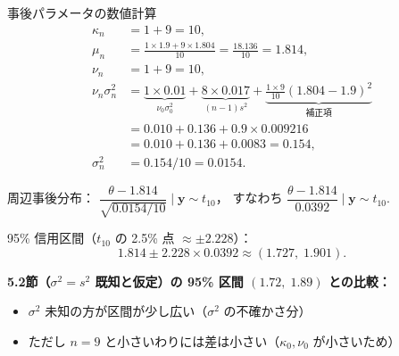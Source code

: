\documentclass[lualatex,ja=standard,a4paper,12pt]{bxjsarticle}
\begin{document}
\begin{derivbox}{事後パラメータの数値計算}
\begin{align*}
  \kappa_n &= 1 + 9 = 10, \\[4pt]
  \mu_n &= \frac{1 \times 1.9 + 9 \times 1.804}{10} = \frac{18.136}{10} = 1.814, \\[4pt]
  \nu_n &= 1 + 9 = 10, \\[4pt]
  \nu_n\sigma_n^2
  &= \underbrace{1 \times 0.01}_{\nu_0\sigma_0^2}
   + \underbrace{8 \times 0.017}_{(n-1)s^2}
   + \underbrace{\frac{1 \times 9}{10}(1.804 - 1.9)^2}_{\text{補正項}} \\
  &= 0.010 + 0.136 + 0.9 \times 0.009216 \\
  &= 0.010 + 0.136 + 0.0083 = 0.154, \\[4pt]
  \sigma_n^2 &= 0.154/10 = 0.0154.
\end{align*}

周辺事後分布：
$\dfrac{\theta - 1.814}{\sqrt{0.0154/10}} \mid \mathbf{y} \sim t_{10}$，
すなわち $\dfrac{\theta - 1.814}{0.0392} \mid \mathbf{y} \sim t_{10}$.

95\% 信用区間（$t_{10}$ の 2.5\% 点 $\approx \pm 2.228$）：
\[
  1.814 \pm 2.228 \times 0.0392 \approx (1.727,\; 1.901).
\]

\noindent\textbf{5.2節（$\sigma^2 = s^2$ 既知と仮定）の 95\% 区間 $(1.72,\; 1.89)$ との比較：}
\begin{itemize}
  \item $\sigma^2$ 未知の方が区間が少し広い（$\sigma^2$ の不確かさ分）
  \item ただし $n=9$ と小さいわりには差は小さい（$\kappa_0, \nu_0$ が小さいため）
\end{itemize}
\end{derivbox}

\begin{center}
\end{center}
\end{document}
